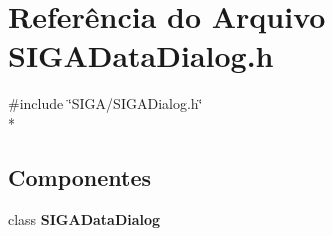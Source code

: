 \section{Referência do Arquivo S\+I\+G\+A\+Data\+Dialog.\+h}
\label{_s_i_g_a_data_dialog_8h}
{\ttfamily \#include \char`\"{}S\+I\+G\+A/\+S\+I\+G\+A\+Dialog.\+h\char`\"{}}\\*
\subsection*{Componentes}
\begin{DoxyCompactItemize}
\item 
class {\bf S\+I\+G\+A\+Data\+Dialog}
\end{DoxyCompactItemize}
